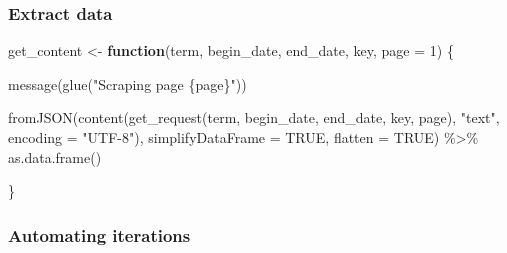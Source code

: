 \documentclass[
]{book}
\newenvironment{Shaded}{\begin{snugshade}}{\end{snugshade}}
\newcommand{\AttributeTok}[1]{\textcolor[rgb]{0.77,0.63,0.00}{#1}}
\newcommand{\ConstantTok}[1]{\textcolor[rgb]{0.00,0.00,0.00}{#1}}
\newcommand{\ControlFlowTok}[1]{\textcolor[rgb]{0.13,0.29,0.53}{\textbf{#1}}}
\newcommand{\DecValTok}[1]{\textcolor[rgb]{0.00,0.00,0.81}{#1}}
\newcommand{\FunctionTok}[1]{\textcolor[rgb]{0.00,0.00,0.00}{#1}}
\newcommand{\NormalTok}[1]{#1}
\newcommand{\OtherTok}[1]{\textcolor[rgb]{0.56,0.35,0.01}{#1}}
\newcommand{\SpecialCharTok}[1]{\textcolor[rgb]{0.00,0.00,0.00}{#1}}
\newcommand{\StringTok}[1]{\textcolor[rgb]{0.31,0.60,0.02}{#1}}
\begin{document}
\hypertarget{extract-data}{%
\subsubsection{Extract data}\label{extract-data}}

\begin{Shaded}
\begin{Highlighting}[]
\NormalTok{get\_content }\OtherTok{\textless{}{-}} \ControlFlowTok{function}\NormalTok{(term, begin\_date, end\_date, key, }\AttributeTok{page =} \DecValTok{1}\NormalTok{) \{}

    \FunctionTok{message}\NormalTok{(}\FunctionTok{glue}\NormalTok{(}\StringTok{"Scraping page \{page\}"}\NormalTok{))}

    \FunctionTok{fromJSON}\NormalTok{(}\FunctionTok{content}\NormalTok{(}\FunctionTok{get\_request}\NormalTok{(term, begin\_date, end\_date, key, page),}
                     \StringTok{"text"}\NormalTok{,}
                \AttributeTok{encoding =} \StringTok{"UTF{-}8"}\NormalTok{),}
                \AttributeTok{simplifyDataFrame =} \ConstantTok{TRUE}\NormalTok{, }\AttributeTok{flatten =} \ConstantTok{TRUE}\NormalTok{) }\SpecialCharTok{\%\textgreater{}\%} \FunctionTok{as.data.frame}\NormalTok{()}

\NormalTok{\}}
\end{Highlighting}
\end{Shaded}

\hypertarget{automating-iterations}{%
\subsubsection{Automating iterations}\label{automating-iterations}}
\end{document}
